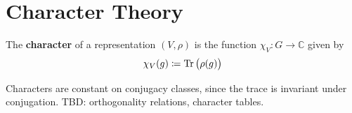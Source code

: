 \section{Character Theory}

  \begin{definition}[Character]
    \label{def:rep-character}
    The \textbf{character} of a representation $(V, \rho)$ is the function $\chi_V: G \to \mathbb{C}$ given by 
    \begin{equation}
      \chi_V(g) \coloneqq \operatorname{Tr}\big( \rho(g) \big)
    \end{equation}
  \end{definition}

  Characters are constant on conjugacy classes, since the trace is invariant under conjugation. TBD: orthogonality relations, character tables. 
